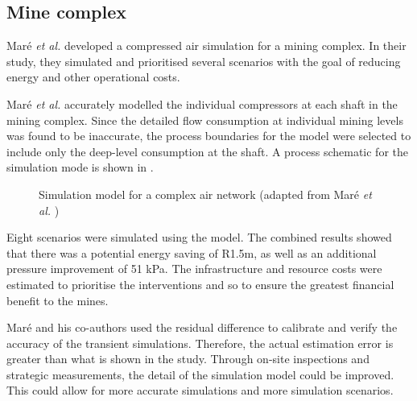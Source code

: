 \subsection{Mine complex}
Maré \textit{et al.} \cite{Mare2017Evaluating} developed a compressed air simulation for a mining complex. In their study, they simulated and prioritised several scenarios with the goal of reducing energy and other operational costs. 
\par
 Maré \textit{et al.} accurately modelled the individual compressors at each shaft in the mining complex. Since the detailed flow consumption at individual mining levels was found to be inaccurate, the process boundaries for the model were selected to include only the deep-level consumption at the shaft. A process schematic for the simulation mode is shown in .
 
 \begin{figure}[!htbp]
 	\centering
 	\caption[Simulation model for a complex air network]{Simulation model for a complex air network (adapted from Maré \textit{et al.} \cite{Mare2017Evaluating})}
 	\label{fig:Mare model}
 \end{figure}
\par 
 Eight scenarios were simulated using the model. The combined results showed that there was a potential energy saving of R1.5m, as well as an additional pressure improvement of 51 kPa. The infrastructure and resource costs were estimated to prioritise the interventions and so to ensure the greatest financial benefit to the mines.	
\par
	Maré and his co-authors used the residual difference to calibrate and verify the accuracy of the transient simulations. Therefore, the actual estimation error is greater than what is shown in the study. Through on-site inspections and strategic measurements, the detail of the simulation model could be improved. This could allow for more accurate simulations and more simulation scenarios.
